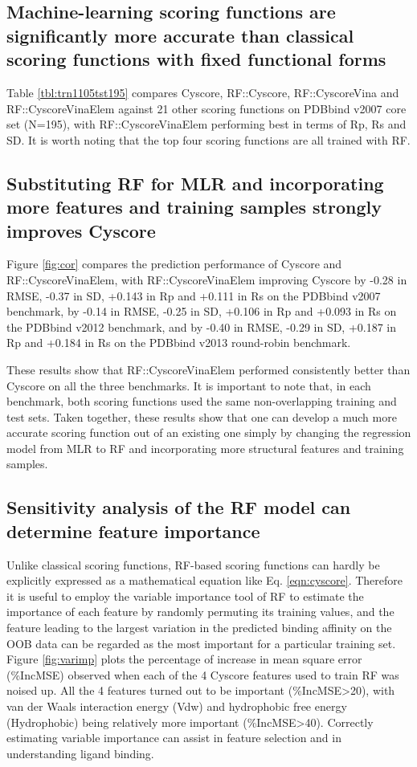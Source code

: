 \documentclass[twocolumn]{bmcart}
\begin{document}
\subsection*{Machine-learning scoring functions are significantly more accurate than classical scoring functions with fixed functional forms}

Table \ref{tbl:trn1105tst195} compares Cyscore, RF::Cyscore, RF::CyscoreVina and RF::CyscoreVinaElem against 21 other scoring functions on PDBbind v2007 core set (N=195), with RF::CyscoreVinaElem performing best in terms of Rp, Rs and SD. It is worth noting that the top four scoring functions are all trained with RF.

\subsection*{Substituting RF for MLR and incorporating more features and training samples strongly improves Cyscore}

Figure \ref{fig:cor} compares the prediction performance of Cyscore and RF::CyscoreVinaElem, with RF::CyscoreVinaElem improving Cyscore by -0.28 in RMSE, -0.37 in SD, +0.143 in Rp and +0.111 in Rs on the PDBbind v2007 benchmark, by -0.14 in RMSE, -0.25 in SD, +0.106 in Rp and +0.093 in Rs on the PDBbind v2012 benchmark, and by -0.40 in RMSE, -0.29 in SD, +0.187 in Rp and +0.184 in Rs on the PDBbind v2013 round-robin benchmark.

These results show that RF::CyscoreVinaElem performed consistently better than Cyscore on all the three benchmarks. It is important to note that, in each benchmark, both scoring functions used the same non-overlapping training and test sets. Taken together, these results show that one can develop a much more accurate scoring function out of an existing one simply by changing the regression model from MLR to RF and incorporating more structural features and training samples.

\subsection*{Sensitivity analysis of the RF model can determine feature importance}

Unlike classical scoring functions, RF-based scoring functions can hardly be explicitly expressed as a mathematical equation like Eq. \ref{eqn:cyscore}. Therefore it is useful to employ the variable importance tool of RF to estimate the importance of each feature by randomly permuting its training values, and the feature leading to the largest variation in the predicted binding affinity on the OOB data can be regarded as the most important for a particular training set. Figure \ref{fig:varimp} plots the percentage of increase in mean square error (\%IncMSE) observed when each of the 4 Cyscore features used to train RF was noised up. All the 4 features turned out to be important (\%IncMSE\textgreater 20), with van der Waals interaction energy (Vdw) and hydrophobic free energy (Hydrophobic) being relatively more important (\%IncMSE\textgreater 40). Correctly estimating variable importance can assist in feature selection and in understanding ligand binding.
\end{document}
